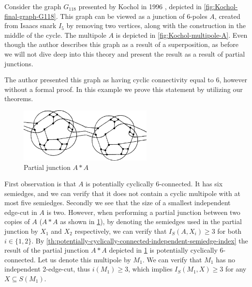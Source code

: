 \documentclass[12pt, twoside]{book}
\begin{document}
\begin{example}
	Consider the graph $G_{118}$ presented by Kochol in 1996 \cite{Kochol1996}, depicted in \cref{fig:Kochol-final-graph-G118}. This graph can be viewed as a junction of 6-poles $A$, created from Isaacs snark $I_5$ \cite{Isaacs1975} by removing two vertices, along with the construction in the middle of the cycle. The multipole $A$ is depicted in \cref{fig:Kochol-multipole-A}. Even though the author describes this graph as a result of a superposition, as before we will not dive deep into this theory and present the result as a result of partial junctions.
	
	The author presented this graph as having cyclic connectivity equal to 6, however without a formal proof. In this example we prove this statement by utilizing our theorems.
	
	\begin{figure}
		\centering
		\includegraphics[width=0.6\textwidth]{images/Kochol-article/Kochol-multipoles-first-junction}
		\caption{Partial junction $A*A$}
		\label{fig:Kochol-first-partial-junction}
	\end{figure}
	
	First observation is that $A$ is potentially cyclically 6-connected. It has six semiedges, and we can verify that it does not contain a cyclic multipole with at most five semiedges. Secondly we see that the size of a smallest independent edge-cut in $A$ is two. However, when performing a partial junction between two copies of $A$ ($A*A$ as shown in \cref{fig:Kochol-first-partial-junction}), by denoting the semiedges used in the partial junction by $X_1$ and $X_2$ respectively, we can verify that $I_S(A,X_i)\geq 3$ for both $i\in\{1,2\}$. By \cref{th:potentially-cyclically-connected-independent-semiedge-index} the result of the partial junction $A*A$ depicted in \cref{fig:Kochol-first-partial-junction} is potentially cyclically 6-connected. Let us denote this multipole by $M_1$. We can verify that $M_1$ has no independent 2-edge-cut, thus $i(M_1)\geq 3$, which implies $I_S(M_1, X)\geq 3$ for any $X\subseteq S(M_1)$.
	

\end{example}
\end{document}
